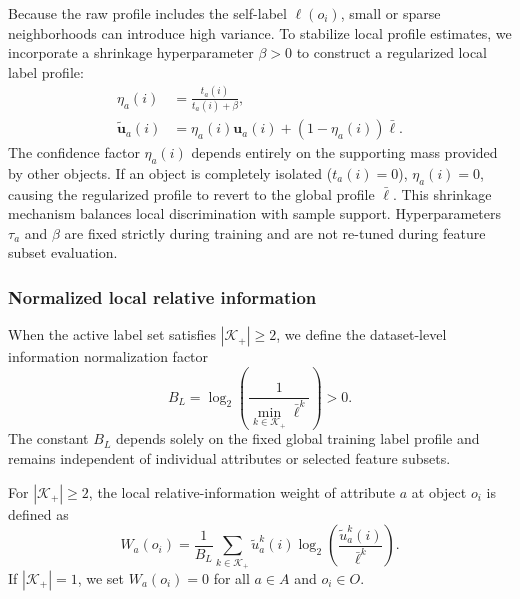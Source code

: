 Because the raw profile includes the self-label $\boldsymbol{\ell}(o_i)$, small or sparse neighborhoods can introduce high variance. To stabilize local profile estimates, we incorporate a shrinkage hyperparameter $\beta > 0$ to construct a regularized local label profile:
\begin{align}
	\eta_a(i) &= \frac{t_a(i)}{t_a(i) + \beta}, \label{eq:profile-confidence} \\
	\widetilde{\boldsymbol{u}}_a(i) &= \eta_a(i) \boldsymbol{u}_a(i) + (1 - \eta_a(i)) \bar{\boldsymbol{\ell}}. \label{eq:regularized-local-profile}
\end{align}
The confidence factor $\eta_a(i)$ depends entirely on the supporting mass provided by other objects. If an object is completely isolated ($t_a(i) = 0$), $\eta_a(i) = 0$, causing the regularized profile to revert to the global profile $\bar{\boldsymbol{\ell}}$. This shrinkage mechanism balances local discrimination with sample support. Hyperparameters $\tau_a$ and $\beta$ are fixed strictly during training and are not re-tuned during feature subset evaluation.

\subsubsection{Normalized local relative information}
When the active label set satisfies $|\mathcal{K}_+| \ge 2$, we define the dataset-level information normalization factor
\begin{equation}
	B_L = \log_2 \left( \frac{1}{\min_{k \in \mathcal{K}_+} \bar{\ell}^k} \right) > 0.
	\label{eq:information-normalizer}
\end{equation}
The constant $B_L$ depends solely on the fixed global training label profile and remains independent of individual attributes or selected feature subsets.

\begin{definition}
	\label{def:local-relative-weight}
	For $|\mathcal{K}_+| \ge 2$, the local relative-information weight of attribute $a$ at object $o_i$ is defined as
	\begin{equation}
		W_a(o_i) = \frac{1}{B_L} \sum_{k \in \mathcal{K}_+} \widetilde{u}_a^k(i) \log_2 \left( \frac{\widetilde{u}_a^k(i)}{\bar{\ell}^k} \right).
		\label{eq:relative-information-weight}
	\end{equation}
	If $|\mathcal{K}_+| = 1$, we set $W_a(o_i) = 0$ for all $a \in A$ and $o_i \in O$.
\end{definition}

